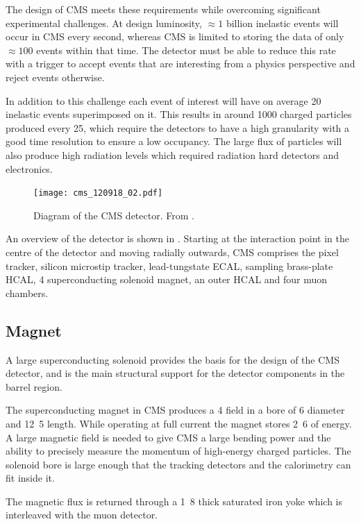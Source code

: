 The design of CMS meets these requirements while overcoming significant
experimental challenges.  At design luminosity, $\approx 1 $ billion inelastic
events will occur in CMS every second, whereas CMS is limited to storing the
data of only $\approx 100 $ events within that time.  The detector must be able to
reduce this rate with a trigger to accept events that are interesting from a
physics perspective and reject events otherwise.

In addition to this challenge each event of interest will have on average 20
inelastic events superimposed on it. This results in around 1000 charged
particles produced every \unit{25}{\ns}, which require the detectors to
have a high granularity with a good time resolution to ensure a low occupancy.
The large flux of particles will also produce high radiation levels which 
required radiation hard detectors and electronics.

\begin{figure}[htbp]
  \centering
  \texttt{[image: cms\_120918\_02.pdf]}
  \caption{Diagram of the CMS detector. From \cite{SketchUpCMSGallery}.}
  \label{fig:CMSnc}
\end{figure}

An overview of the detector is shown in .  Starting at the
interaction point in the centre of the detector and moving radially outwards,
CMS comprises the pixel tracker, silicon microstip tracker, lead-tungstate ECAL,
sampling brass-plate HCAL, \unit{4}{\tesla} superconducting solenoid magnet, an
outer HCAL and four muon chambers.

\subsection{Magnet}
A large superconducting solenoid provides the basis for the design of the CMS
detector, and is the main structural support for the detector components in the
barrel region.

The superconducting magnet in CMS produces a \unit{4}{\tesla} field in a bore of
\unit{6}{\meter} diameter and \unit{12.5}{\meter} length.  While operating at
full current the magnet stores \unit{2.6}{\giga\joule} of energy.  A large
magnetic field is needed to give CMS a large bending power and the ability to
precisely measure the momentum of high-energy charged particles.  The solenoid
bore is large enough that the tracking detectors and the calorimetry can fit
inside it\cite{chatrchyan2008cms}.

The magnetic flux is returned through a \unit{1.8}{\meter} thick saturated iron
yoke which is interleaved with the muon detector.

